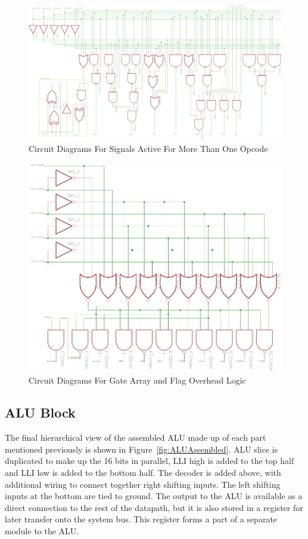 \begin{figure}[h!]
	\centering
	\includegraphics[width=\textwidth]{Figures/ALUDecoderMore1v2.png}
	\caption{Circuit Diagrams For Signals Active For More Than One Opcode}
	\label{fig:DecMultiCirs}
\end{figure}


\begin{figure}[h]
	\centering
	\includegraphics[scale=0.75]{Figures/ALUDecoderGateArrayv2.png}
	\caption{Circuit Diagrams For Gate Array and Flag Overhead Logic}
	\label{fig:GateArray}
\end{figure}

\subsection{ALU Block}
The final hierarchical view of the assembled ALU made up of each part mentioned previously is shown in Figure~\ref{fig:ALUAssembled}. 
ALU slice is duplicated to make up the 16 bits in parallel, LLI high is added to the top half and LLI low is added to the bottom half. 
The decoder is added above, with additional wiring to connect together right shifting inputs. 
The left shifting inputs at the bottom are tied to ground. 
The output to the ALU is available as a direct connection to the rest of the datapath, but it is also stored in a register for later transfer onto the system bus. 
This register forms a part of a separate module to the ALU. 


